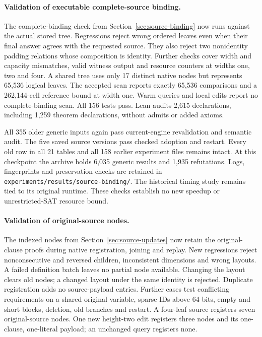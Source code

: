 \documentclass[11pt,a4paper]{article}
\numberwithin{equation}{section}
\theoremstyle{plain}
\theoremstyle{definition}
\theoremstyle{remark}
\begin{document}
\paragraph{Validation of executable complete-source binding.}
The complete-binding check from Section~\ref{sec:source-binding} now runs against the actual stored tree. Regressions reject wrong ordered leaves even when their final answer agrees with the requested source. They also reject two nonidentity padding relations whose composition is identity. Further checks cover width and capacity mismatches, valid witness output and resource counters at widths one, two and four. A shared tree uses only 17 distinct native nodes but represents 65,536 logical leaves. The accepted scan reports exactly 65,536 comparisons and a 262,144-cell reference bound at width one. Warm queries and local edits report no complete-binding scan. All 156 tests pass. Lean audits 2,615 declarations, including 1,259 theorem declarations, without admits or added axioms.

All 355 older generic inputs again pass current-engine revalidation and semantic audit. The five saved source versions pass checked adoption and restart. Every old row in all 21 tables and all 158 earlier experiment files remains intact. At this checkpoint the archive holds 6,035 generic results and 1,935 refutations. Logs, fingerprints and preservation checks are retained in \texttt{experiments/results/source-binding/}. The historical timing study remains tied to its original runtime. These checks establish no new speedup or unrestricted-SAT resource bound.

\paragraph{Validation of original-source nodes.}
The indexed nodes from Section~\ref{sec:source-updates} now retain the original-clause proofs during native registration, joining and replay. New regressions reject nonconsecutive and reversed children, inconsistent dimensions and wrong layouts. A failed definition batch leaves no partial node available. Changing the layout clears old nodes; a changed layout under the same identity is rejected. Duplicate registration adds no source-payload entries. Further cases test conflicting requirements on a shared original variable, sparse IDs above 64 bits, empty and short blocks, deletion, old branches and restart. A four-leaf source registers seven original-source nodes. One new height-two edit registers three nodes and its one-clause, one-literal payload; an unchanged query registers none.
\end{document}
